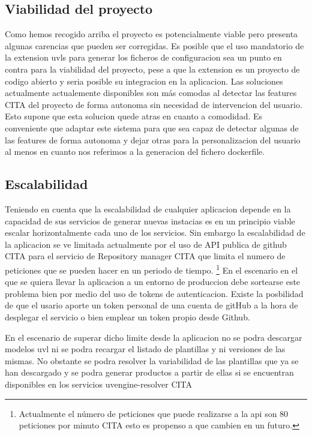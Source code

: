 \documentclass[12pt, a4paper, twoside]{article}
\begin{document}
\subsection{Viabilidad del proyecto}
Como hemos recogido arriba el proyecto es potencialmente viable pero presenta algunas carencias que pueden ser corregidas.
Es posible que el uso mandatorio de la extension uvls para generar los ficheros de configuracion sea un punto en contra para la viabilidad del proyecto, pese a que la extension es un proyecto de codigo abierto y seria posible su integracion en la aplicacion.
Las soluciones actualmente actualemente disponibles son más comodas al detectar las features CITA del proyecto de forma autonoma sin necesidad de intervencion del usuario. Esto supone que esta solucion quede atras en cuanto a comodidad. Es conveniente que adaptar este sistema 
para que sea capaz de detectar algunas de las features de forma autonoma y dejar otras para la personalizacion del usuario al menos en cuanto nos referimos a la generacion del fichero dockerfile.
\subsection{Escalabilidad}
Teniendo en cuenta que la escalabilidad de cualquier aplicacion depende en la capacidad de sus servicios de generar nuevas instacias es en un principio viable 
escalar horizontalmente cada uno de los servicios. Sin embargo la escalabilidad de la aplicacion se ve limitada actualmente por el uso de API publica de github CITA 
para el servicio de Repository manager CITA que limita el numero de peticiones que se pueden hacer en un periodo de tiempo.
\footnote{Actualmente el número de peticiones que puede realizarse a la api son 80 peticiones por minuto CITA esto es propenso a que cambien en un futuro.}
En el escenario en el que se quiera llevar la aplicacion a un entorno de produccion debe sortearse este problema bien por medio del uso de tokens de autenticacion.
Existe la posbilidad de que el usario aporte un token personal de una cuenta de gitHub a la hora de desplegar el servicio o bien emplear un token propio desde Github.

En el escenario de superar dicho limite desde la aplicacion no se podra descargar modelos uvl ni se podra recargar el listado de plantillas y ni versiones de las mismas.
No obstante se podra resolver la variabilidad de las plantillas que ya se han descargado y se podra generar productos a partir de ellas si se encuentran disponibles en los servicios 
uvengine-resolver CITA 
\end{document}
